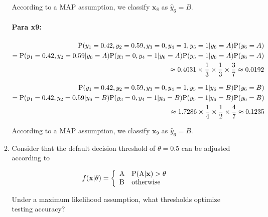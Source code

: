 \documentclass[12pt]{article}
\begin{document}
\begin{enumerate}[leftmargin=\labelsep]
\begin{enumerate}
        According to a MAP assumption, we classify $\mathbf{x}_8$ as $\hat{y}_6 = B$.

        \paragraph{Para x9:}

        \begin{equation}
        \begin{split}
            \textrm{P}(y_1 = 0.42, y_2 = 0.59, y_3 = 0, y_4 = 1, y_5 = 1|y_6 = A)\textrm{P}(y_6 = A)\\
            = \textrm{P}(y_1 = 0.42, y_2 = 0.59|y_6 = A)\textrm{P}(y_3 = 0, y_4 = 1|y_6 = A)\textrm{P}(y_5 = 1|y_6 = A)\textrm{P}(y_6 = A)\\
            \approx 0.4031 \times \frac{1}{3} \times \frac{1}{3} \times \frac{3}{7} \approx 0.0192
        \end{split}
        \end{equation}

        \begin{equation}
        \begin{split}
            \textrm{P}(y_1 = 0.42, y_2 = 0.59, y_3 = 0, y_4 = 1, y_5 = 1|y_6 = B)\textrm{P}(y_6 = B)\\
            = \textrm{P}(y_1 = 0.42, y_2 = 0.59|y_6 = B)\textrm{P}(y_3 = 0, y_4 = 1|y_6 = B)\textrm{P}(y_5 = 1|y_6 = B)\textrm{P}(y_6 = B)\\
            \approx 1.7286 \times \frac{1}{4} \times \frac{1}{2} \times \frac{4}{7} \approx 0.1235
        \end{split}
        \end{equation}

        According to a MAP assumption, we classify $\mathbf{x}_9$ as $\hat{y}_6 = B$.

        \item  Consider that the default decision threshold of $\theta = 0.5$ can be adjusted according to
    
            \[ 
            f(\mathbf{x}|\theta)= \left\{
            \begin{array}{ll}
                  \textrm{A} & \textrm{P}(\textrm{A}|\mathbf{x}) > \theta \\
                  \textrm{B} & \textrm{otherwise}
            \end{array} 
            \right. 
            \]

            Under a maximum likelihood assumption, what thresholds optimize testing accuracy?
    \end{enumerate}


\end{enumerate}
\end{document}
